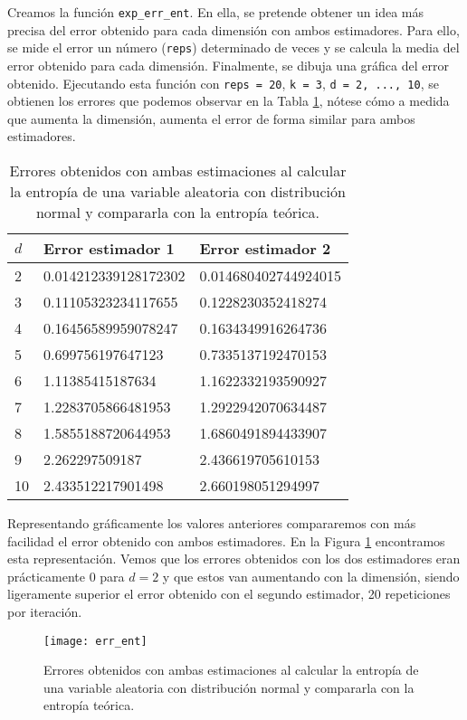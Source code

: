 \documentclass[12pt,a4paper]{report} %
\theoremstyle{definition}
\begin{document}
Creamos la función \texttt{exp\_err\_ent}. En ella, se pretende obtener un idea más precisa del error obtenido para cada dimensión con ambos estimadores. Para ello, se mide el error un número (\texttt{reps}) determinado de veces y se calcula la media del error obtenido para cada dimensión. Finalmente, se dibuja una gráfica del error obtenido. Ejecutando esta función con \texttt{reps = 20}, \texttt{k = 3}, \texttt{d = 2, ..., 10}, se obtienen los errores que podemos observar en la Tabla \ref{tab:err_ent}, nótese cómo a medida que aumenta la dimensión, aumenta el error de forma similar para ambos estimadores.\\

\begin{table}[H]
\centering
\caption{Errores obtenidos con ambas estimaciones al calcular la entropía de una variable aleatoria con distribución normal y compararla con la entropía teórica.}
\label{tab:err_ent}
\begin{tabular}{lll}
\toprule
$d$ & Error estimador 1 & Error estimador 2\\ \midrule
2 & 0.014212339128172302 & 0.014680402744924015\\
3 & 0.11105323234117655 & 0.1228230352418274\\
4 & 0.16456589959078247 & 0.1634349916264736\\
5 & 0.699756197647123 & 0.7335137192470153\\
6 & 1.11385415187634 & 1.1622332193590927\\
7 & 1.2283705866481953 & 1.2922942070634487\\
8 & 1.5855188720644953 & 1.6860491894433907\\
9 & 2.262297509187 & 2.436619705610153\\
10 & 2.433512217901498 & 2.660198051294997\\
\bottomrule
\end{tabular}
\end{table}

Representando gráficamente los valores anteriores compararemos con más facilidad el error obtenido con ambos estimadores. En la Figura \ref{fig:err_ent} encontramos esta representación. Vemos que los errores obtenidos con los dos estimadores eran prácticamente $0$ para $d=2$ y que estos van aumentando con la dimensión, siendo ligeramente superior el error obtenido con el segundo estimador, 20 repeticiones por iteración.\\

\begin{figure}[!htb]
    \centering
    \texttt{[image: err\_ent]}
    \caption{Errores obtenidos con ambas estimaciones al calcular la entropía de una variable aleatoria con distribución normal y compararla con la entropía teórica.}
    \label{fig:err_ent}
\end{figure}
\end{document}
